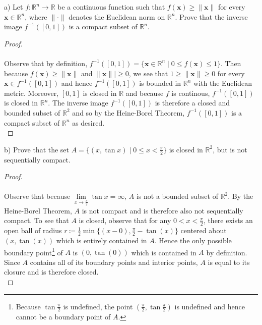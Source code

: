 a) Let $f: \mathbb{R}^n \to \mathbb{R}$ be a continuous function such that $f(\textbf{x}) \ge \lVert \textbf{x} \rVert$
   for every $\textbf{x} \in \mathbb{R}^n$, where $\lVert \cdot \rVert$ denotes the Euclidean norm on $\mathbb{R}^n$.
   Prove that the inverse image $f^{-1}([0, 1])$ is a compact subset of $\mathbb{R}^n$.

\begin{proof}\ \\\\
   Observe that by definition, $f^{-1}([0, 1]) = \{ \textbf{x} \in \mathbb{R}^n \mid 0 \le f(\textbf{x}) \le 1 \}$.
   Then because $f(\textbf{x}) \ge \lVert \textbf{x} \lVert$ and $\lVert \textbf{x} \rVert| \ge 0$, we see that 
   $1 \ge \lVert \textbf{x} \rVert \ge 0$ for every $\textbf{x} \in f^{-1}([0, 1])$ and hence $f^{-1}([0, 1])$ is
   bounded in $\mathbb{R}^n$ with the Euclidean metric. Moreover, $[0, 1]$ is closed in $\mathbb{R}$ and because $f$
   is continous, $f^{-1}([0, 1])$ is closed in $\mathbb{R}^n$. The inverse image $f^{-1}([0, 1])$ is therefore a closed
   and bounded subset of $\mathbb{R}^2$ and so by the Heine-Borel Theorem, $f^{-1}([0, 1])$ is a compact subset of 
   $\mathbb{R}^n$ as desired.
   \ \\
\end{proof}

\pagebreak

b) Prove that the set $A = \{(x, \tan{x}) \mid 0 \le x < \frac{\pi}{2} \}$ is closed in $\mathbb{R}^2$, but is not 
   sequentially compact.

\begin{proof}\ \\\\
   Observe that because $\lim\limits_{x \to \frac{\pi}{2}}{\tan{x}} = \infty$, $A$ is not a bounded subset of 
   $\mathbb{R}^2$. By the Heine-Borel Theorem, $A$ is not compact and is therefore also not sequentially compact.
   To see that $A$ is closed, observe that for any $0 < x < \frac{\pi}{2}$, there exists an open ball of radius 
   $r \coloneqq \frac{1}{2} \min{\{(x - 0), \frac{\pi}{2} - \tan(x)\}}$ centered about $(x, \tan(x))$ which is entirely
   contained in $A$. Hence the only possible boundary point\footnote{
      Because $\tan{\frac{\pi}{2}}$ is undefined, the point $(\frac{\pi}{2}, \tan{\frac{\pi}{2}})$ is undefined and
      hence cannot be a boundary point of $A$.
   } of $A$ is $(0, \tan(0))$ which is contained in $A$ by definition. Since $A$ contains all of its boundary points and
   interior points, $A$ is equal to its closure and is therefore closed.
   \ \\
\end{proof}

